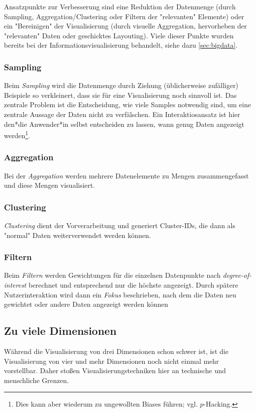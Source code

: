 			Ansatzpunkte zur Verbesserung sind \zB eine Reduktion der Datenmenge (\zB durch Sampling, Aggregation/Clustering oder Filtern der "relevanten" Elemente) oder ein "Bereinigen" der Visualisierung (\zB durch visuelle Aggregation, hervorheben der "relevanten" Daten oder geschicktes Layouting). Viele dieser Punkte wurden bereits bei der Informationsvisualisierung behandelt, siehe dazu \autoref{sec:bigdata}.

			\subsubsection{Sampling}
				Beim \emph{Sampling} wird die Datenmenge durch Ziehung (üblicherweise zufälliger) Beispiele so verkleinert, dass sie für eine Visualisierung noch sinnvoll ist. Das zentrale Problem ist die Entscheidung, wie viele Samples notwendig sind, um eine zentrale Aussage der Daten nicht zu verfälschen. Ein Interaktiosansatz ist hier den*die Anwender*in selbst entscheiden zu lassen, wann genug Daten angezeigt werden\footnote{Dies kann aber wiederum zu ungewollten Biases führen; vgl. \(p\)-Hacking.}.

			\subsubsection{Aggregation}
				Bei der \emph{Aggregation} werden mehrere Datenelemente zu Mengen zusammengefasst und diese Mengen visualisiert.

			\subsubsection{Clustering}
				\emph{Clustering} dient der Vorverarbeitung und generiert Cluster-IDs, die dann als "normal" Daten weiterverwendet werden können.

			\subsubsection{Filtern}
				Beim \emph{Filtern} werden Gewichtungen für die einzelnen Datenpunkte nach \emph{degree-of-interest} berechnet und entsprechend nur die höchste angezeigt. Durch spätere Nutzerinteraktion wird dann ein \emph{Fokus} beschrieben, nach dem die Daten neu gewichtet oder andere Daten angezeigt werden können

		\subsection{Zu viele Dimensionen}
			Während die Visualisierung von drei Dimensionen schon schwer ist, ist die Visualisierung von vier und mehr Dimensionen noch nicht einmal mehr vorstellbar. Daher stoßen Visualisierungstechniken hier an technische und menschliche Grenzen.

